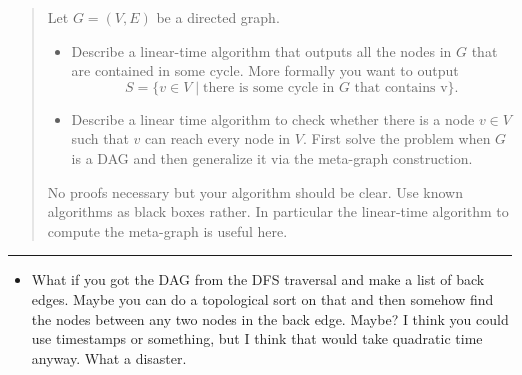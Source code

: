 \documentclass[11pt]{article}
\begin{document}

\begin{quote}
Let $G=(V,E)$ be a directed graph.
  \begin{itemize}
  \item Describe a linear-time algorithm that outputs all the nodes in
    $G$ that are contained in some cycle. More formally you want to
    output
    $$S = \{ v \in V \mid \text{there is some cycle in $G$ that
      contains v}\}.$$
  \item Describe a linear time algorithm to check whether there is a
    node $v \in V$ such that $v$ can reach every node in $V$. First
    solve the problem when $G$ is a DAG and then generalize it via the
    meta-graph construction.
  \end{itemize}
  No proofs necessary but your algorithm should be clear. Use known
  algorithms as black boxes rather. In particular the linear-time algorithm to
  compute the meta-graph is useful here.
\end{quote}
\hrule



\begin{solution}
    \begin{itemize}
        \item What if you got the DAG from the DFS traversal and make a list of back edges. Maybe you can do a topological sort on that and then somehow find the nodes between any two nodes in the back edge. Maybe? I think you could use timestamps or something, but I think that  would take quadratic time anyway. What a disaster.
    \end{itemize}
\end{solution}

\end{document}
